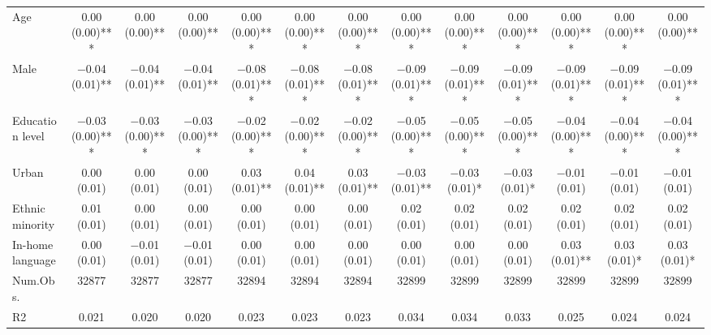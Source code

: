 \begin{table}
\begin{tabular}[t]{lcccccccccccc}
Age & \num{0.00} (\num{0.00})*** & \num{0.00} (\num{0.00})** & \num{0.00} (\num{0.00})** & \num{0.00} (\num{0.00})*** & \num{0.00} (\num{0.00})*** & \num{0.00} (\num{0.00})*** & \num{0.00} (\num{0.00})*** & \num{0.00} (\num{0.00})*** & \num{0.00} (\num{0.00})*** & \num{0.00} (\num{0.00})*** & \num{0.00} (\num{0.00})*** & \num{0.00} (\num{0.00})**\\
Male & \num{-0.04} (\num{0.01})** & \num{-0.04} (\num{0.01})** & \num{-0.04} (\num{0.01})** & \num{-0.08} (\num{0.01})*** & \num{-0.08} (\num{0.01})*** & \num{-0.08} (\num{0.01})*** & \num{-0.09} (\num{0.01})*** & \num{-0.09} (\num{0.01})*** & \num{-0.09} (\num{0.01})*** & \num{-0.09} (\num{0.01})*** & \num{-0.09} (\num{0.01})*** & \num{-0.09} (\num{0.01})***\\
Education level & \num{-0.03} (\num{0.00})*** & \num{-0.03} (\num{0.00})*** & \num{-0.03} (\num{0.00})*** & \num{-0.02} (\num{0.00})*** & \num{-0.02} (\num{0.00})*** & \num{-0.02} (\num{0.00})*** & \num{-0.05} (\num{0.00})*** & \num{-0.05} (\num{0.00})*** & \num{-0.05} (\num{0.00})*** & \num{-0.04} (\num{0.00})*** & \num{-0.04} (\num{0.00})*** & \num{-0.04} (\num{0.00})***\\
Urban & \num{0.00} (\num{0.01}) & \num{0.00} (\num{0.01}) & \num{0.00} (\num{0.01}) & \num{0.03} (\num{0.01})** & \num{0.04} (\num{0.01})** & \num{0.03} (\num{0.01})** & \num{-0.03} (\num{0.01})** & \num{-0.03} (\num{0.01})* & \num{-0.03} (\num{0.01})* & \num{-0.01} (\num{0.01}) & \num{-0.01} (\num{0.01}) & \num{-0.01} (\num{0.01})\\
Ethnic minority & \num{0.01} (\num{0.01}) & \num{0.00} (\num{0.01}) & \num{0.00} (\num{0.01}) & \num{0.00} (\num{0.01}) & \num{0.00} (\num{0.01}) & \num{0.00} (\num{0.01}) & \num{0.02} (\num{0.01}) & \num{0.02} (\num{0.01}) & \num{0.02} (\num{0.01}) & \num{0.02} (\num{0.01}) & \num{0.02} (\num{0.01}) & \num{0.02} (\num{0.01})\\
In-home language & \num{0.00} (\num{0.01}) & \num{-0.01} (\num{0.01}) & \num{-0.01} (\num{0.01}) & \num{0.00} (\num{0.01}) & \num{0.00} (\num{0.01}) & \num{0.00} (\num{0.01}) & \num{0.00} (\num{0.01}) & \num{0.00} (\num{0.01}) & \num{0.00} (\num{0.01}) & \num{0.03} (\num{0.01})** & \num{0.03} (\num{0.01})* & \num{0.03} (\num{0.01})*\\
\midrule
Num.Obs. & \num{32877} & \num{32877} & \num{32877} & \num{32894} & \num{32894} & \num{32894} & \num{32899} & \num{32899} & \num{32899} & \num{32899} & \num{32899} & \num{32899}\\
R2 & \num{0.021} & \num{0.020} & \num{0.020} & \num{0.023} & \num{0.023} & \num{0.023} & \num{0.034} & \num{0.034} & \num{0.033} & \num{0.025} & \num{0.024} & \num{0.024}\\

\end{tabular}
\end{table}
